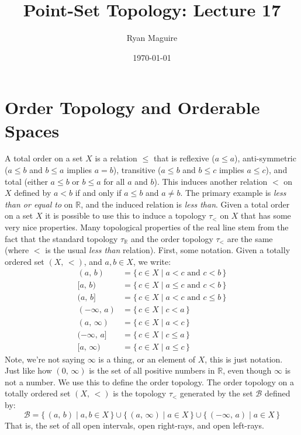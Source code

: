 \documentclass{article}
\title{Point-Set Topology: Lecture 17}
\author{Ryan Maguire}
\date{\today}
\theoremstyle{plain}
\theoremstyle{normal}
\newenvironment{definition}{%
    \pushQED{\qed}\renewcommand{\qedsymbol}{$\blacksquare$}\definitionx%
}{%
    \popQED\enddefinitionx%
}
\begin{document}
    \maketitle
    \section{Order Topology and Orderable Spaces}
        A total order on a set $X$ is a relation $\leq$ that is reflexive
        ($a\leq{a}$), anti-symmetric
        ($a\leq{b}$ and $b\leq{a}$ implies $a=b$), transitive
        ($a\leq{b}$ and $b\leq{c}$ implies $a\leq{c}$), and total
        (either $a\leq{b}$ or $b\leq{a}$ for all $a$ and $b$). This induces
        another relation $<$ on $X$ defined by $a<b$ if and only if $a\leq{b}$
        and $a\ne{b}$. The primary example is
        \textit{less than or equal to} on $\mathbb{R}$, and the induced relation
        is \textit{less than}. Given a total order on a set $X$ it is possible
        to use this to induce a topology $\tau_{<}$ on $X$ that has some very
        nice properties. Many topological properties of the real line stem from
        the fact that the standard topology $\tau_{\mathbb{R}}$ and the
        order topology $\tau_{<}$ are the same (where $<$ is the usual
        \textit{less than} relation). First, some notation. Given a totally
        ordered set $(X,\,<)$, and $a,b\in{X}$, we write:
        \begin{align}
            (a,\,b)&=\{\,c\in{X}\;|\;a<c\textrm{ and }c<b\,\}\\
            [a,\,b)&=\{\,c\in{X}\;|\;a\leq{c}\textrm{ and }c<b\,\}\\
            (a,\,b]&=\{\,c\in{X}\;|\;a<c\textrm{ and }c\leq{b}\,\}\\
            (-\infty,\,a)&=\{\,c\in{X}\;|\;c<a\,\}\\
            (a,\,\infty)&=\{\,c\in{X}\;|\;a<c\,\}\\
            (-\infty,\,a]&=\{\,c\in{X}\;|\;c\leq{a}\,\}\\
            [a,\,\infty)&=\{\,c\in{X}\;|\;a\leq{c}\,\}
        \end{align}
        Note, we're not saying $\infty$ is a thing, or an element of $X$, this
        is just notation. Just like how $(0,\,\infty)$ is the set of all
        positive numbers in $\mathbb{R}$, even though $\infty$ is not a number.
        We use this to define the order topology.
        \begin{definition}[\textbf{Order Topology}]
            The order topology on a totally ordered set $(X,\,<)$ is the
            topology $\tau_{<}$ generated by the set $\mathcal{B}$ defined by:
            \begin{equation}
                \mathcal{B}=\{\,(a,\,b)\;|\;a,b\in{X}\,\}
                    \cup\{\,(a,\,\infty)\;|\;a\in{X}\,\}
                    \cup\{\,(-\infty,\,a)\;|\;a\in{X}\,\}
            \end{equation}
            That is, the set of all open intervals, open right-rays, and
            open left-rays.
        \end{definition}
\end{document}
